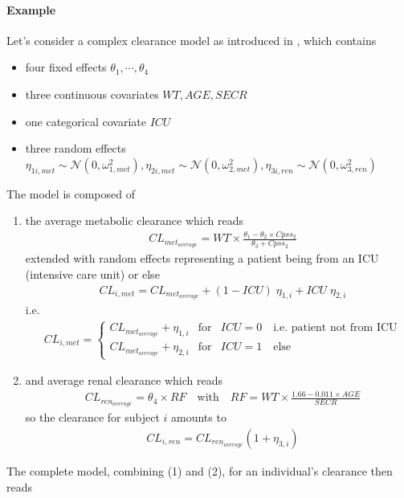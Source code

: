 \paragraph{Example}
Let's consider a complex clearance model as introduced in \cite{NONMEM:2006aa}, which contains
\begin{itemize}
\item
four fixed effects $\theta_1, \cdots, \theta_4$
\item
three continuous covariates $WT, AGE, SECR$
\item
one categorical covariate $ICU$
\item
three random effects $\eta_{1i,met}\sim \mathcal{N}(0,\omega_{1,met}^2),\eta_{2i,met}\sim \mathcal{N}(0,\omega_{2,met}^2), \eta_{3i,ren}\sim \mathcal{N}(0,\omega_{3,ren}^2)$
\end{itemize}
The model is composed of
\begin{enumerate}
\item
the average metabolic clearance which reads
\begin{align*}
& CL_{met_{average}} = WT\times \frac{\theta_1 - \theta_2 \times Cpss_2}{\theta_3 + Cpss_2}
\end{align*}
extended with random effects representing a patient being from an ICU (intensive care unit) or else
\begin{align*}
& CL_{i,met} = CL_{met_{average}} + (1 - ICU) \; \eta_{1,i} + ICU \; \eta_{2,i}
\end{align*}
i.e.
\begin{align*}
& CL_{i,met} = \left\{ \begin{array}{lcl}  CL_{met_{average}} + \eta_{1,i}  & \mbox{for} & ICU = 0 \quad \text{i.e. patient not from ICU} \\
CL_{met_{average}} + \eta_{2,i}  & \mbox{for} & ICU = 1 \quad \text{else}
\end{array}\right.
\end{align*}
\item
and average renal clearance which reads
\begin{align*}
& CL_{ren_{average}} = \theta_4 \times RF \quad \text{with}  \quad
RF = WT\times \frac{1.66 - 0.011 \times AGE}{SECR}
\end{align*}
so the clearance for subject $i$ amounts to
\begin{align*}
& CL_{i,ren} = CL_{ren_{average}}(1+ \eta_{3,i})
\end{align*}
\end{enumerate}
The complete model, combining (1) and (2), for an individual's clearance then reads
